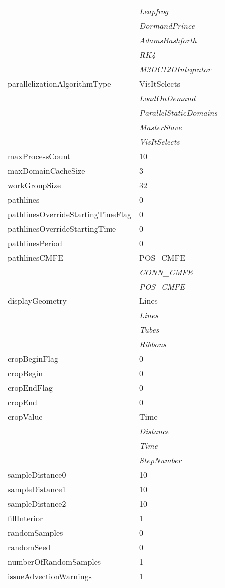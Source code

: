 \documentclass[10pt,a4paper]{report}
\begin{document}
\begin{longtable}{ll}
 & {\it  Leapfrog} \\
 & {\it  DormandPrince} \\
 & {\it  AdamsBashforth} \\
 & {\it  RK4} \\
 & {\it  M3DC12DIntegrator} \\
parallelizationAlgorithmType  &  VisItSelects   \\
 & {\it  LoadOnDemand} \\
 & {\it  ParallelStaticDomains} \\
 & {\it  MasterSlave} \\
 & {\it  VisItSelects} \\
maxProcessCount  &  10 \\
maxDomainCacheSize  &  3 \\
workGroupSize  &  32 \\
pathlines  &  0 \\
pathlinesOverrideStartingTimeFlag  &  0 \\
pathlinesOverrideStartingTime  &  0 \\
pathlinesPeriod  &  0 \\
pathlinesCMFE  &  POS\_CMFE   \\
 & {\it  CONN\_CMFE} \\
 & {\it  POS\_CMFE} \\
displayGeometry  &  Lines   \\
 & {\it  Lines} \\
 & {\it  Tubes} \\
 & {\it  Ribbons} \\
cropBeginFlag  &  0 \\
cropBegin  &  0 \\
cropEndFlag  &  0 \\
cropEnd  &  0 \\
cropValue  &  Time   \\
 & {\it  Distance} \\
 & {\it  Time} \\
 & {\it  StepNumber} \\
sampleDistance0  &  10 \\
sampleDistance1  &  10 \\
sampleDistance2  &  10 \\
fillInterior  &  1 \\
randomSamples  &  0 \\
randomSeed  &  0 \\
numberOfRandomSamples  &  1 \\
issueAdvectionWarnings  &  1 \\

\end{longtable}
\end{document}
